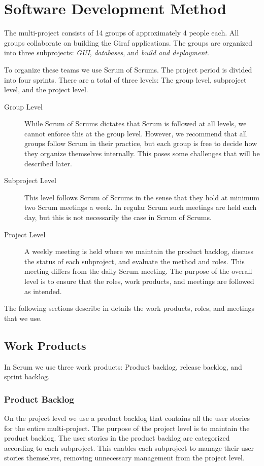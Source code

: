 \chapter{Software Development Method}%
The multi-project consists of 14 groups of approximately 4 people each. All groups collaborate on building the Giraf applications. The groups are organized into three subprojects: \emph{GUI}, \emph{databases}, and \emph{build and deployment}.

To organize these teams we use Scrum of Scrums. The project period is divided into four sprints. There are a total of three levels: The group level, subproject level, and the project level.

\begin{description}
	\item[Group Level] While Scrum of Scrums dictates that Scrum is followed at all levels, we cannot enforce this at the group level. However, we recommend that all groups follow Scrum in their practice, but each group is free to decide how they organize themselves internally. This poses some challenges that will be described later.
	\item[Subproject Level] This level follows Scrum of Scrums in the sense that they hold at minimum two Scrum meetings a week. In regular Scrum such meetings are held each day, but this is not necessarily the case in Scrum of Scrums.
	\item[Project Level] A weekly meeting is held where we maintain the product backlog, discuss the status of each subproject, and evaluate the method and roles. This meeting differs from the daily Scrum meeting. The purpose of the overall level is to ensure that the roles, work products, and meetings are followed as intended.
\end{description}

The following sections describe in details the work products, roles, and meetings that we use.

\section{Work Products}
In Scrum we use three work products: Product backlog, release backlog, and sprint backlog.

\subsection{Product Backlog}
On the project level we use a product backlog that contains all the user stories for the entire multi-project. The purpose of the project level is to maintain the product backlog. The user stories in the product backlog are categorized according to each subproject. This enables each subproject to manage their user stories themselves, removing unnecessary management from the project level.

